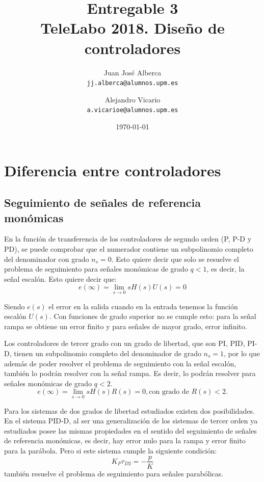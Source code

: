 \documentclass[a4paper]{article}
\begin{document}
\title{Entregable 3 \\
\large TeleLabo 2018. Diseño de controladores}
\author{
	Juan José Alberca\\
	\texttt{jj.alberca@alumnos.upm.es}
	\and
	Alejandro Vicario\\
	\texttt{a.vicarioe@alumnos.upm.es}
}
\date{\today}


\maketitle


\section{Diferencia entre controladores}
\subsection{Seguimiento de señales de referencia monómicas}
En la función de transferencia de los controladores de segundo orden (P, P-D y PD), se puede comprobar que el numerador contiene un subpolinomio completo del denominador con grado $n_s=0$. Esto quiere decir que solo se resuelve el problema de seguimiento para señales monómicas de grado $q<1$, es decir, la señal escalón. Esto quiere decir que:
\begin{equation}
	e(\infty)=\lim_{s \rightarrow 0}
	s H(s) U(s) = 0
\end{equation}

Siendo $e(s)$ el error en la salida cuando en la entrada tenemos la función escalón $U(s)$. Con funciones de grado superior no se cumple esto: para la señal rampa se obtiene un error finito y para señales de mayor grado, error infinito.

Los controladores de tercer grado con un grado de libertad, que son PI, PID, PI-D, tienen un subpolinomio completo del denominador de grado $n_s=1$, por lo que además de poder resolver el problema de seguimiento con la señal escalón, también lo podrán resolver con la señal rampa. Es decir, lo podrán resolver para señales monómicas de grado $q<2$.
\begin{equation}
e(\infty)=\lim_{s \rightarrow 0}
s H(s) R(s) = 0, \textrm{con grado de } R(s)<2.
\end{equation}

Para los sistemas de dos grados de libertad estudiados existen dos posibilidades. En el sistema PID-D, al ser una generalización de los sistemas de tercer orden ya estudiados posee las mismas propiedades en el sentido del seguimiento de señales de referencia monómicas, es decir, hay error nulo para la rampa y error finito para la parábola. Pero si este sistema cumple la siguiente condición:
\begin{equation}
	K_P \tau_{D2} = -\frac{p}{K}
\end{equation}
también resuelve el problema de seguimiento para señales parabólicas.
\end{document}
